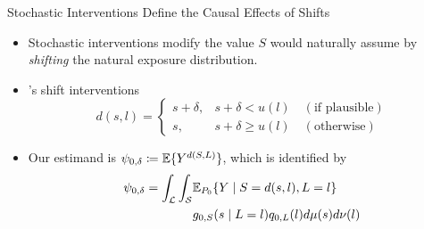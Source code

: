 \documentclass{beamer}
\begin{document}
\begin{frame}[c]{Stochastic Interventions Define the Causal Effects of Shifts}

\begin{center}
\begin{itemize}
  \itemsep8pt
  \item Stochastic interventions modify the value $S$ would naturally assume by
    \textit{shifting} the natural exposure distribution.
  \item \cite{diaz2012population, diaz2018stochastic}'s shift
    interventions\footnotemark
     \begin{equation*}\label{shift_intervention}
       d(s, l) =
         \begin{cases}
           s + \delta, & s + \delta < u(l) \quad (\text{if plausible}) \\
           s, & s + \delta \geq u(l) \quad (\text{otherwise})
         \end{cases}
     \end{equation*}
  \item Our estimand is $\psi_{0,\delta} \coloneqq
    \mathbb{E} \{Y^{d(S,L)}\}$, which is identified by
    \begin{align*}\label{eqn:identification2012}
      \psi_{0,\delta} = \int_{\mathcal{L}} \int_{\mathcal{S}} &\mathbb{E}_{P_0}
        \{Y \mid S = d(s, l), L = l\} \\ &g_{0, S}(s \mid L = l)
        q_{0, L}(l) d\mu(s)d\nu(l)
    \end{align*}
\end{itemize}
\end{center}



\end{frame}
\end{document}
